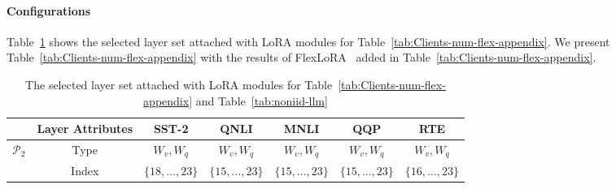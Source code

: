 \documentclass{article}
\theoremstyle{plain}
\theoremstyle{definition}
\theoremstyle{remark}
\begin{document}
\paragraph{Configurations}
Table~\ref{tab:layer_type_index-client-num} shows the selected layer set attached with LoRA modules for Table~\ref{tab:Clients-num-flex-appendix}. We present Table~\ref{tab:Clients-num-flex-appendix} with the results of FlexLoRA~\cite{bai2024federatedfinetuninglargelanguage} added in Table~\ref{tab:Clients-num-flex-appendix}.
\begin{table}[h!]
\centering
{\footnotesize
    \begin{tabular}{ccccccc}
    \toprule
                            & Layer Attributes & SST-2 & QNLI & MNLI & QQP & RTE \\
                            \midrule
\multirow{2}{*}{$\mathcal{P}_2$} & Type             &     $W_v,W_q$   &  $W_v,W_q$     &   $W_v,W_q$    &   $W_v,W_q$   &   $W_v,W_q$   \\
                    & Index            &   $\{18,\ldots,23\}$    &   $\{15,\ldots,23\}$   &  $\{15,\ldots,23\}$    &   $\{15,\ldots,23\}$  &  $\{16,\ldots,23\}$    \\ \bottomrule
    \end{tabular}}
    \vspace{4pt}
    \caption{The selected layer set attached with LoRA modules for Table~\ref{tab:Clients-num-flex-appendix} and Table~\ref{tab:noniid-llm}}
    \label{tab:layer_type_index-client-num}
\end{table}
\end{document}
